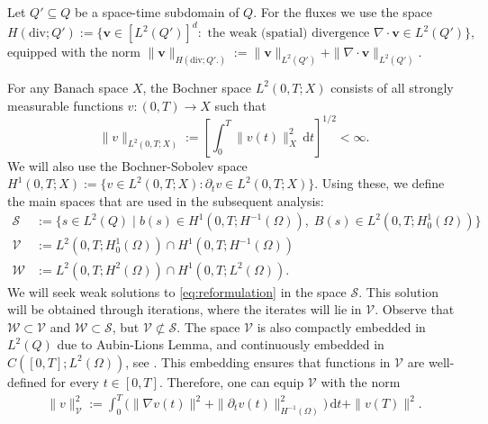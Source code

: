\documentclass[review,11pt]{article}
\numberwithin{equation}{section}
\def \R  {{\mathbb{R}}}
\def \dd {\mathrm{d}}
\def \calV {\mathcal{V}}
\def \calS {\mathcal{S}}
\def \nhat {\bm{n}_{\mathrm{x}}}
\newcommand\AJ[1]{%
  \protect\leavevmode
  \begingroup
        \color{red!30!blue}%
        #1%
  \endgroup
}
\begin{document}
\noindent
Let $Q'\subseteq Q$ be a space-time subdomain of $Q$. For the fluxes we use the space
\[
H(\mathrm{div};Q')
:= \big\{ \mathbf{v} \in [L^2(Q')]^d : \text{ the weak (spatial) divergence } \nabla\!\cdot \mathbf{v} \in L^2(Q') \big\},
\]
equipped with the norm $\|\mathbf{v}\|_{H(\mathrm{div};Q'.)} 
:= \|\mathbf{v}\|_{L^2(Q')} + \|\nabla\!\cdot \mathbf{v}\|_{L^2(Q')}$.

\noindent
For any Banach space $X$, the Bochner space  $L^2(0,T;X)$ consists of all strongly measurable functions $v:(0,T)\to X$ such that
\[
\|v\|_{L^2(0,T;X)}
:=\left[\int_0^T \|v(t)\|_X^2\,\dd t \right]^{1/2}
<\infty.
\]
We will also use the Bochner-Sobolev space $H^1(0,T;X)
:=\{v\in L^2(0,T;X): \partial_t v\in L^2(0,T;X)\}$. Using these, we define the main spaces that are used in the subsequent analysis:
\begin{subequations}\label{eq:spaces}
 \begin{align}
\mathcal{S} &:= \Big\{ s \in L^2(Q) 
\;\big|\; 
b(s) \in H^1(0,T;H^{-1}(\Omega)), \;
B(s) \in L^2(0,T;H_0^1(\Omega))\Big\}\\
\mathcal{V} &:= L^2(0,T;H_0^1(\Omega)) \cap H^1(0,T;H^{-1}(\Omega)) \\
\mathcal{W} &:= L^2(0,T;H^2(\Omega)) \cap H^1(0,T;L^2(\Omega)).
\end{align}
\end{subequations}
We will seek weak solutions to \eqref{eq:reformulation} in the space $\calS$. This solution will be obtained through iterations, where the iterates will lie in $\mathcal{V}$. Observe that $\mathcal{W} \subset \mathcal{V}$ and $\mathcal{W}\subset \calS$, but $\calV\not\subset \calS$.
The space $\mathcal{V}$ is also compactly embedded in $L^2(Q)$ due to Aubin-Lions Lemma, and continuously embedded in $C([0,T];L^2(\Omega))$, see \cite{simon1986compact}. This embedding ensures that functions in $\mathcal{V}$ are well-defined for every $t \in [0, T]$. Therefore, one can equip  $\mathcal{V}$ with the norm
\begin{align}\label{eq:norm_V}
    \|v\|_{\mathcal V}^2
:=\int_0^T \!\big(\|\nabla v(t)\|^2+\|\partial_t v(t)\|_{H^{-1}(\Omega)}^2\big)\,\dd t
+\|v(T)\|^2.
\end{align}
\noindent
\end{document}
